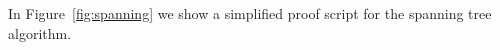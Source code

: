 
\appendix



In Figure~\ref{fig:spanning} we show a simplified proof script for
the spanning tree algorithm.